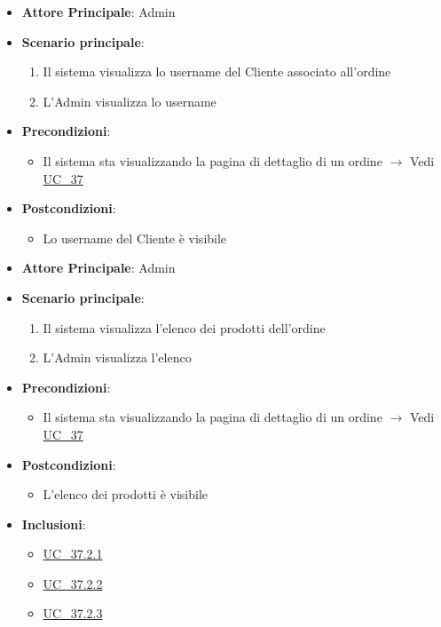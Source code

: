 \label{uc_37.1}

\begin{itemize}
    \item \textbf{Attore Principale}: Admin
	\item \textbf{Scenario principale}:
	\begin{enumerate}
		\item Il sistema visualizza lo username del Cliente associato all'ordine
		\item L'Admin visualizza lo username
	\end{enumerate}
	\item \textbf{Precondizioni}:
	\begin{itemize}
		\item Il sistema sta visualizzando la pagina di dettaglio di un ordine $\rightarrow$ Vedi \hyperref[uc_37]{UC\_37}
	\end{itemize}
	\item \textbf{Postcondizioni}:
	\begin{itemize}
		\item Lo username del Cliente è visibile
	\end{itemize}
\end{itemize}

\label{uc_37.2}

\begin{itemize}
    \item \textbf{Attore Principale}: Admin
	\item \textbf{Scenario principale}:
	\begin{enumerate}
		\item Il sistema visualizza l'elenco dei prodotti dell'ordine
		\item L'Admin visualizza l'elenco
	\end{enumerate}
	\item \textbf{Precondizioni}:
	\begin{itemize}
		\item Il sistema sta visualizzando la pagina di dettaglio di un ordine $\rightarrow$ Vedi \hyperref[uc_37]{UC\_37}
	\end{itemize}
	\item \textbf{Postcondizioni}:
	\begin{itemize}
		\item L'elenco dei prodotti è visibile
	\end{itemize}
	\item \textbf{Inclusioni}:
	\begin{itemize}
		\item \hyperref[uc_37.2.1]{UC\_37.2.1}
		\item \hyperref[uc_37.2.2]{UC\_37.2.2}
		\item \hyperref[uc_37.2.3]{UC\_37.2.3}
	\end{itemize}
\end{itemize}

